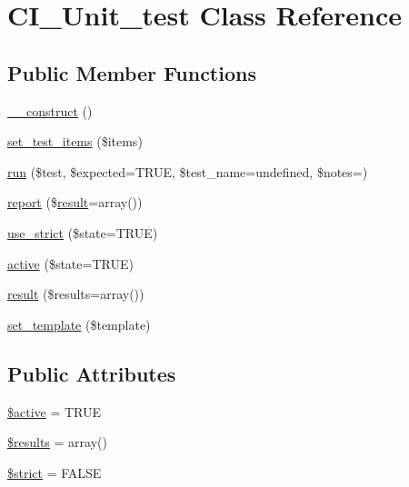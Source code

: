 \hypertarget{class_c_i___unit__test}{}\section{C\+I\+\_\+\+Unit\+\_\+test Class Reference}
\label{class_c_i___unit__test}
\subsection*{Public Member Functions}
\begin{DoxyCompactItemize}
\item 
\mbox{\hyperlink{class_c_i___unit__test_a095c5d389db211932136b53f25f39685}{\+\_\+\+\_\+construct}} ()
\item 
\mbox{\hyperlink{class_c_i___unit__test_a78e364204a36821e23124ae97d447aa3}{set\+\_\+test\+\_\+items}} (\$items)
\item 
\mbox{\hyperlink{class_c_i___unit__test_a0bb74f4cb9553ace4034633e69383c55}{run}} (\$test, \$expected=T\+R\+UE, \$test\+\_\+name=\textquotesingle{}undefined\textquotesingle{}, \$notes=\textquotesingle{}\textquotesingle{})
\item 
\mbox{\hyperlink{class_c_i___unit__test_a339c46eabb709c1c492bc264c9634171}{report}} (\$\mbox{\hyperlink{class_c_i___unit__test_adcfdd404b2f2610e0690b4beb7786ce5}{result}}=array())
\item 
\mbox{\hyperlink{class_c_i___unit__test_a3b12a79f69fab4221a0b887bdac1ba83}{use\+\_\+strict}} (\$state=T\+R\+UE)
\item 
\mbox{\hyperlink{class_c_i___unit__test_ac7b3030630fc7dd31513c75cf27c1a8a}{active}} (\$state=T\+R\+UE)
\item 
\mbox{\hyperlink{class_c_i___unit__test_adcfdd404b2f2610e0690b4beb7786ce5}{result}} (\$results=array())
\item 
\mbox{\hyperlink{class_c_i___unit__test_ae65d1ab2a626d4ddfda31befc2b347f6}{set\+\_\+template}} (\$template)
\end{DoxyCompactItemize}
\subsection*{Public Attributes}
\begin{DoxyCompactItemize}
\item 
\mbox{\hyperlink{class_c_i___unit__test_aacd1fa47b7ea59451aff98beca4360ae}{\$active}} = T\+R\+UE
\item 
\mbox{\hyperlink{class_c_i___unit__test_a233d12bd8b6d3453e9a7a3f0b8c31db2}{\$results}} = array()
\item 
\mbox{\hyperlink{class_c_i___unit__test_a856bf794dded1ba70be4dfae635a1b06}{\$strict}} = F\+A\+L\+SE
\end{DoxyCompactItemize}
